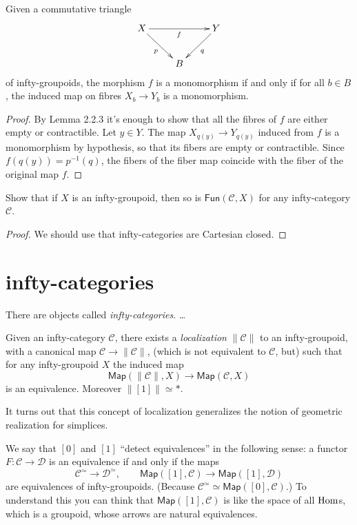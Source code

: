 \begin{exercise}[2.8]
\label{exercise-2.8}
Given a commutative triangle
$$
\xymatrix{
X \ar[rd]_{p} \ar[rr]_{f} && Y \ar[dl]^{q} \\
& B
}
$$
of infty-groupoids, the morphism $f$ is a
monomorphism
if and only if for all $b \in B$, the
induced map on fibres $X_b \to Y_b$ is a
monomorphism.
\end{exercise}

\begin{proof}
By Lemma 2.2.3 it's enough to show that all
the fibres of
$f$ are either empty or contractible.
Let $y \in Y$. The map $X_{q(y)}\to Y_{q(y)}$
induced from $f$
is a monomorphism by hypothesis, so that its
fibers
are empty or contractible. Since
$f(q(y))=p^{-1}(q)$,
the fibers of the fiber map coincide with the
fiber of the
original map $f$.
\end{proof}

\begin{exercise}[2.9]
\label{exercise-2.9}
Show that if $X$ is an infty-groupoid,
then so is $\mathsf{Fun}(\mathcal{C},X)$
for any infty-category $\mathcal{C}$.
\end{exercise}

\begin{proof}
We should use that
infty-categories are Cartesian closed.
\end{proof}

\section{infty-categories}
\label{section-infty-categories}

\noindent
There are objects called {\it
infty-categories}. …

\medskip\noindent
Given an infty-category $\mathcal{C}$,
there exists
a {\it localization} $\|\mathcal{C}\|$ to an
infty-groupoid, with a canonical map
$\mathcal{C} \to \|\mathcal{C}\|$,
(which is not equivalent to $\mathcal{C}$,
but)
such that for any infty-groupoid $X$
the induced map
$$
\mathsf{Map}(\|\mathcal{C}\|,X) \to
\mathsf{Map}(\mathcal{C},X)
$$
is an equivalence.
Moreover  $\|[1]\|\simeq *$.

It turns out that this concept of
localization
generalizes the notion of geometric
realization
for simplices.

\medskip\noindent
We say that $[0]$ and $[1]$ ``detect
equivalences''
in the following sense:
a functor $F: \mathcal{C} \to \mathcal{D}$ is
an equivalence if and only if the maps
$$
\mathcal{C}^{\simeq} \to
\mathcal{D}^{\simeq},\qquad
\mathsf{Map}([1],\mathcal{C})\to\mathsf{Map}
([1],\mathcal{D})
$$
are equivalences of infty-groupoids.
(Because $\mathcal{C}^\simeq \simeq
\mathsf{Map}([0], \mathcal{C})$.)
To understand this you can think that
$\mathsf{Map}([1],\mathcal{C})$ is like
the space of all $\mathop{\mathrm{Hom}}\nolimits$s, which is a
groupoid,
whose arrows are natural equivalences.

